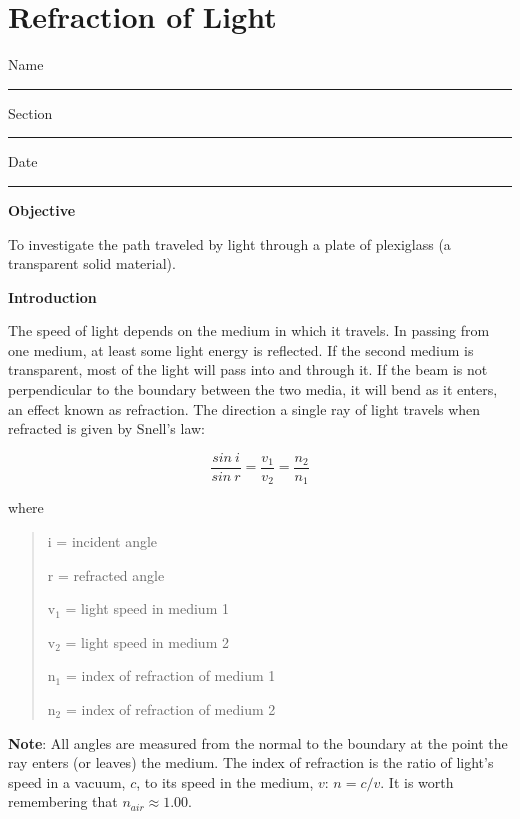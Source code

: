 
\section{Refraction of Light}

Name \rule{2.0in}{0.1pt}\hfill{}Section \rule{1.0in}{0.1pt}\hfill{}Date
\rule{1.0in}{0.1pt}

\textbf{Objective}

To investigate the path traveled by light through a plate of plexiglass
(a transparent solid material).

\textbf{Introduction}

The speed of light depends on the medium in which it travels. In passing
from one medium, at least some light energy is reflected. If the second
medium is transparent, most of the light will pass into and through
it. If the beam is not perpendicular to the boundary between the two
media, it will bend as it enters, an effect known as refraction. The
direction a single ray of light travels when refracted is given by
Snell's law:

\begin{displaymath} \frac{sin~i}{sin~r} = \frac{v_1}{v_2} = \frac{n_2}{n_1} \end{displaymath}

where

\begin{quote}
i = incident angle

r = refracted angle

v\( _{1} \) = light speed in medium 1

v\( _{2} \) = light speed in medium 2

n\( _{1} \) = index of refraction of medium 1 

n\( _{2} \) = index of refraction of medium 2
\end{quote}
\textbf{Note}: All angles are measured from the normal to the boundary
at the point the ray enters (or leaves) the medium. The index of refraction is
the ratio of light's speed in a vacuum, $c$, to its speed in the medium,
$v$: $n = c / v$. It is worth remembering that $n_{air} \approx 1.00$.

